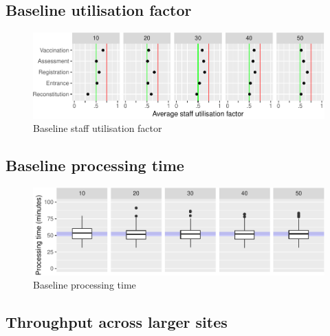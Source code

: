 \documentclass{article}
\begin{document}
\hypertarget{baseline-utilisation-factor}{%
\subsection{Baseline utilisation
factor}\label{baseline-utilisation-factor}}

\begin{figure}[h]

{\centering \includegraphics{Preprint_files/figure-latex/baselineUtilisation-1} 

}

\caption{Baseline staff utilisation factor}\label{fig:baselineUtilisation}
\end{figure}

\hypertarget{baseline-processing-time}{%
\subsection{Baseline processing time}\label{baseline-processing-time}}

\begin{figure}[h]

{\centering \includegraphics{Preprint_files/figure-latex/baselineProcessTime-1} 

}

\caption{Baseline processing time}\label{fig:baselineProcessTime}
\end{figure}

\hypertarget{throughput-across-larger-sites}{%
\subsection{Throughput across larger
sites}\label{throughput-across-larger-sites}}
\end{document}
